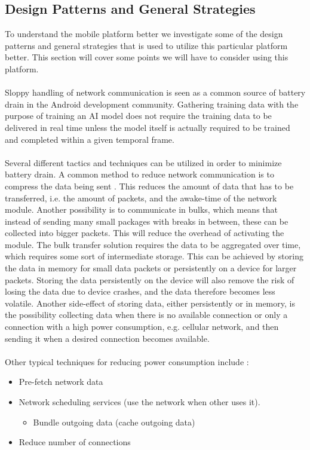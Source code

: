 \subsection{Design Patterns and General Strategies}
To understand the mobile platform better we investigate some of the design patterns and general strategies that is used to utilize this particular platform better. This section will cover some points we will have to consider using this platform.
\\\\
Sloppy handling of network communication is seen as a common source of battery drain \parencite{android_network_scheduling} in the Android development community. Gathering training data with the purpose of training an AI model does not require the training data to be delivered in real time unless the model itself is actually required to be trained and completed within a given temporal frame. 
\\\\
Several different tactics and techniques can be utilized in order to minimize battery drain. A common method to reduce network communication is to compress the data being sent \parencite{har_wearables}\parencite{android_network_scheduling}. This reduces the amount of data that has to be transferred, i.e. the amount of packets, and the awake-time of the network module. Another possibility is to communicate in bulks, which means that instead of sending many small packages with breaks in between, these can be collected into bigger packets. This will reduce the overhead of activating the module. The bulk transfer solution requires the data to be aggregated over time, which requires some sort of intermediate storage. This can be achieved by storing the data in memory for small data packets or persistently on a device for larger packets. Storing the data persistently on the device will also remove the risk of losing the data due to device crashes, and the data therefore becomes less volatile. Another side-effect of storing data, either persistently or in memory, is the possibility collecting data when there is no available connection or only a connection with a high power consumption, e.g. cellular network, and then sending it when a desired connection becomes available. 
\\\\
Other typical techniques for reducing power consumption include \parencite{android_network_scheduling}:

\begin{itemize}
    \item Pre-fetch network data
    \item Network scheduling services (use the network when other uses it).
    \begin{itemize}
        \item Bundle outgoing data (cache outgoing data)
    \end{itemize}
    \item Reduce number of connections
\end{itemize}


